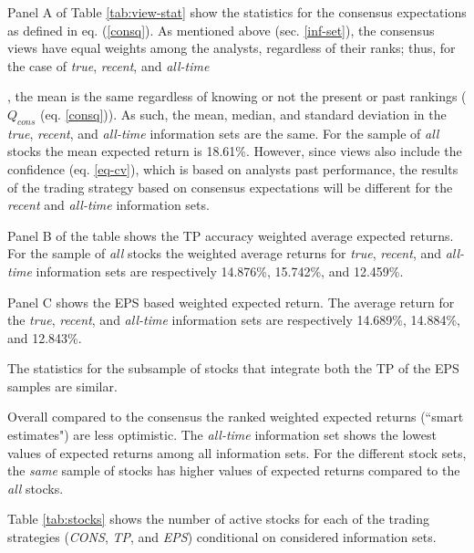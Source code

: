 \documentclass{article}\usepackage[]{graphicx}\usepackage[]{color}
\newcommand{\tr}{\textit{true}}
\newcommand{\naive}{\textit{recent}}
\newcommand{\default}{\textit{all-time}}
\newcommand{\same}{\textit{same}}
\newcommand{\all}{\textit{all}}
\begin{document}
Panel A of Table \ref{tab:view-stat} show the statistics for the consensus expectations as defined in eq. (\ref{consq}). As mentioned above (sec. \ref{inf-set}), the consensus views have equal weights among the analysts, regardless of their ranks; thus, for the case of \tr{}, \naive{}, and \default{, the mean is the same regardless of knowing or not the present or past rankings ($Q_{cons}$ (eq. \ref{consq})). As such, the mean, median, and standard deviation in the \tr{}, \naive{}, and \default{} information sets are the same. For the sample of \all{} stocks the mean expected return is 18.61\%. However, since views also include the confidence (eq. \ref{eq-cv}), which is based on analysts past performance, the results of the trading strategy based on consensus expectations will be different for the \naive{} and \default{} information sets. 


Panel B of the table shows the TP accuracy weighted average expected returns. For the sample of \all{} stocks the weighted average returns for \tr{}, \naive{}, and \default{} information sets are respectively 14.876\%, 15.742\%, and 12.459\%. 


Panel C shows the EPS based weighted expected return. The average return for the \tr{}, \naive{}, and \default{} information sets are respectively 14.689\%, 14.884\%, and 12.843\%.


The statistics for the subsample of stocks that integrate both the TP of the EPS samples are similar.


Overall compared to the consensus the ranked weighted expected returns (``smart estimates") are less optimistic. The \default{} information set shows the lowest values of expected returns among all information sets. For the different stock sets,  the \same{} sample of stocks has higher values of expected returns compared to the \all{} stocks.

Table \ref{tab:stocks} shows the number of active stocks for each of the trading strategies (\textit{CONS}, \textit{TP}, and \textit{EPS}) conditional on considered information sets.


}
\end{document}
